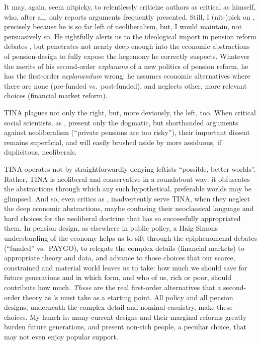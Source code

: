It may, again, seem nitpicky, to relentlessly criticize authors as critical as \cite{Cerami2009a} himself, who, after all, only reports arguments frequently presented.
Still, I (nit-)pick on \citeauthor{Cerami2009a}, precisely because he is so far left of neoliberalism, but, I would maintain, not persuasively so.
He rightfully alerts us to the ideological import in pension reform debates \citeyearpar[340]{Cerami2009a}, but penetrates not nearly deep enough into the economic abstractions of pension-design to fully expose the hegemony he correctly suspects.
Whatever the merits of his second-order \emph{explanans} of a new politics of pension reform, he has the first-order \emph{explanandum} wrong:
he assumes economic alternatives where there are none (pre-funded vs.\ post-funded), and neglects other, more relevant choices (financial market reform).

TINA plagues not only the right, but, more deviously, the left, too.
When critical social scientists, as \cite{Cerami2009a}, present only the dogmatic, but shorthanded arguments against neoliberalism (``private pensions are too risky''), their important dissent remains superficial, and will easily brushed aside by more assiduous, if duplicitous, neoliberals.

TINA operates not by straightforwardly denying leftists ``possible, better worlds''.
Rather, TINA is neoliberal and conservative in a roundabout way:
it obfuscates the abstractions through which any such hypothetical, preferable worlds may be glimpsed.
And so, even critics as \citeauthor{Cerami2009a}, inadvertently serve TINA, when they neglect the deep economic abstractions, maybe confusing their neoclassical language and hard choices for the neoliberal doctrine that has so successfully appropriated them.
In pension design, as elsewhere in public policy, a Haig-Simons understanding of the economy helps us to sift through the epiphenomenal debates (``funded'' vs.\ PAYGO), to relegate the complex details (financial markets) to appropriate theory and data, and advance to those choices that our scarce, constrained and material world leaves us to take:
how much we should save for future generations and in which form, and who of us, rich or poor, should contribute how much.
\emph{These} are the real first-order alternatives that a second-order theory as \citeauthor{Cerami2009a}'s must take as a starting point.
All policy and all pension designs, underneath the complex detail and nominal casuistry, make these choices.
My hunch is:
many  current designs and their marginal reforms greatly burden future generations, and present non-rich people, a peculiar choice, that may not even enjoy popular support.


